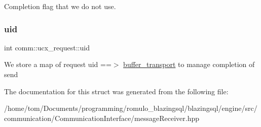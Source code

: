 Completion flag that we do not use. \mbox{\label{structcomm_1_1ucx__request_a7042a8a653b19b41f71e0726be4da6f1}} 
\subsubsection{\texorpdfstring{uid}{uid}}
{\footnotesize\ttfamily int comm\+::ucx\+\_\+request\+::uid}

We store a map of request uid ==$>$ \hyperlink{classcomm_1_1buffer__transport}{buffer\+\_\+transport} to manage completion of send 

The documentation for this struct was generated from the following file\+:\begin{DoxyCompactItemize}
\item 
/home/tom/\+Documents/programming/romulo\+\_\+blazingsql/blazingsql/engine/src/communication/\+Communication\+Interface/message\+Receiver.\+hpp\end{DoxyCompactItemize}
